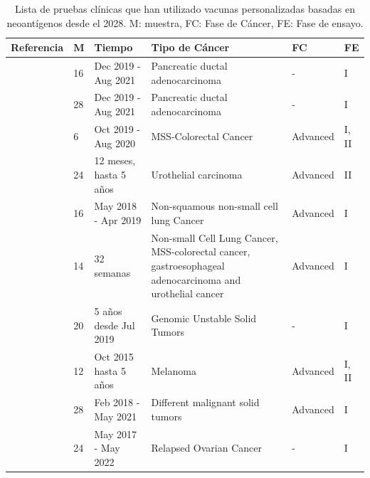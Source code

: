 \begin{table}[h]
	\caption{Lista de pruebas clínicas que han utilizado vacunas personalizadas basadas en neoantígenos desde el 2028. M: muestra, FC: Fase de Cáncer, FE: Fase de ensayo. }
	\label{tab:review_clinics}
	\centering
	\setlength{\tabcolsep}{0.5em} %
	{\renewcommand{\arraystretch}{1.5}%
		{\scriptsize
			\begin{tabular}{p{2.8cm}p{0.5cm}p{2.3cm}p{4.5cm}p{1.5cm}p{0.5cm}}
				\textbf{Referencia} & \textbf{M} & \textbf{Tiempo} & \textbf{Tipo de Cáncer} & \textbf{FC} & \textbf{FE} \\ \midrule
				
				\cite{personalizedVaccinemRNA2023} & 16  & Dec 2019 - Aug 2021 & Pancreatic ductal adenocarcinoma &- & I \\ 
				
				
				
				\cite{rojas2023personalized} & 28  & Dec 2019 - Aug 2021 & Pancreatic ductal adenocarcinoma & -& I \\
				
				\cite{yu2023preliminary} & 6  & Oct 2019 - Aug 2020 & MSS-Colorectal Cancer & Advanced & I, II \\
				
				\cite{holm2022neoantigen} & 24  & 12 meses, hasta 5 años  & Urothelial carcinoma & Advanced & II \\
				
				\cite{awad2022personalized} & 16  &  May 2018 - Apr 2019 & Non-squamous non-small cell lung Cancer & Advanced & I \\
				
				\cite{palmer2022individualized} & 14  & 32 semanas & Non-small Cell Lung Cancer, MSS-colorectal cancer, gastroesophageal adenocarcinoma and urothelial cancer & Advanced & I \\
				
				\cite{wang2022therapy} & 20  & 5 años desde Jul 2019 & Genomic Unstable Solid Tumors &- & I \\
				
				\cite{ellingsen2022characterization} & 12  & Oct 2015 hasta 5 años & Melanoma & Advanced & I, II \\
				
				\cite{shou2022combination} & 28  & Feb 2018 - May  2021 & Different malignant solid tumors & Advanced & I \\
				
				\cite{rocconi2022proof} & 24   &  May  2017 - May  2022 & Relapsed Ovarian Cancer & -& I\\
				

\end{tabular}}}
\end{table}
